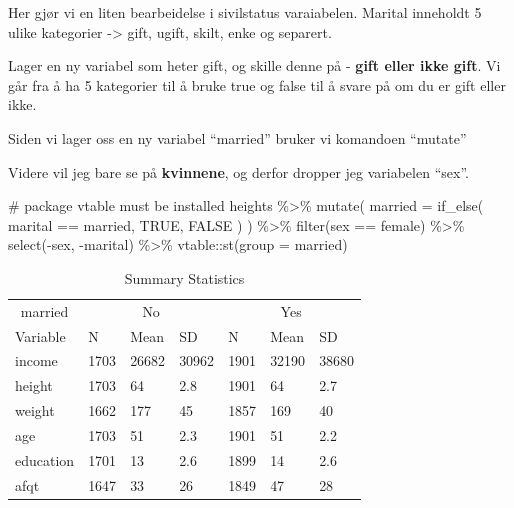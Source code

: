 \documentclass[
  letterpaper,
  DIV=11,
  numbers=noendperiod]{scrartcl}
\newenvironment{Shaded}{\begin{snugshade}}{\end{snugshade}}
\newcommand{\AttributeTok}[1]{\textcolor[rgb]{0.40,0.45,0.13}{#1}}
\newcommand{\CommentTok}[1]{\textcolor[rgb]{0.37,0.37,0.37}{#1}}
\newcommand{\ConstantTok}[1]{\textcolor[rgb]{0.56,0.35,0.01}{#1}}
\newcommand{\FunctionTok}[1]{\textcolor[rgb]{0.28,0.35,0.67}{#1}}
\newcommand{\NormalTok}[1]{\textcolor[rgb]{0.00,0.23,0.31}{#1}}
\newcommand{\SpecialCharTok}[1]{\textcolor[rgb]{0.37,0.37,0.37}{#1}}
\newcommand{\StringTok}[1]{\textcolor[rgb]{0.13,0.47,0.30}{#1}}
\begin{document}
Her gjør vi en liten bearbeidelse i sivilstatus varaiabelen. Marital
inneholdt 5 ulike kategorier -\textgreater{} gift, ugift, skilt, enke og
separert.

Lager en ny variabel som heter gift, og skille denne på - \textbf{gift
eller ikke gift}. Vi går fra å ha 5 kategorier til å bruke true og false
til å svare på om du er gift eller ikke.

Siden vi lager oss en ny variabel ``married'' bruker vi komandoen
``mutate''

Videre vil jeg bare se på \textbf{kvinnene}, og derfor dropper jeg
variabelen ``sex''.

\begin{Shaded}
\begin{Highlighting}[]
\CommentTok{\# package vtable must be installed}
\NormalTok{heights }\SpecialCharTok{\%\textgreater{}\%} 
  \FunctionTok{mutate}\NormalTok{(}
    \AttributeTok{married =} \FunctionTok{if\_else}\NormalTok{(}
\NormalTok{    marital }\SpecialCharTok{==} \StringTok{\textquotesingle{}married\textquotesingle{}}\NormalTok{, }
    \ConstantTok{TRUE}\NormalTok{,}
    \ConstantTok{FALSE}
\NormalTok{    )}
\NormalTok{  ) }\SpecialCharTok{\%\textgreater{}\%} 
  \FunctionTok{filter}\NormalTok{(sex }\SpecialCharTok{==} \StringTok{\textquotesingle{}female\textquotesingle{}}\NormalTok{) }\SpecialCharTok{\%\textgreater{}\%} 
  \FunctionTok{select}\NormalTok{(}\SpecialCharTok{{-}}\NormalTok{sex, }\SpecialCharTok{{-}}\NormalTok{marital) }\SpecialCharTok{\%\textgreater{}\%} 
\NormalTok{  vtable}\SpecialCharTok{::}\FunctionTok{st}\NormalTok{(}\AttributeTok{group =} \StringTok{\textquotesingle{}married\textquotesingle{}}\NormalTok{)}
\end{Highlighting}
\end{Shaded}

\begin{table}

\caption{Summary Statistics}
\centering
\begin{tabular}[t]{lllllll}
\toprule
\multicolumn{1}{c}{married} & \multicolumn{3}{c}{No} & \multicolumn{3}{c}{Yes} \\
\cmidrule(l{3pt}r{3pt}){1-1} \cmidrule(l{3pt}r{3pt}){2-4} \cmidrule(l{3pt}r{3pt}){5-7}
Variable & N & Mean & SD & N & Mean & SD\\
\midrule
income & 1703 & 26682 & 30962 & 1901 & 32190 & 38680\\
height & 1703 & 64 & 2.8 & 1901 & 64 & 2.7\\
weight & 1662 & 177 & 45 & 1857 & 169 & 40\\
age & 1703 & 51 & 2.3 & 1901 & 51 & 2.2\\
education & 1701 & 13 & 2.6 & 1899 & 14 & 2.6\\
\addlinespace
afqt & 1647 & 33 & 26 & 1849 & 47 & 28\\
\bottomrule
\end{tabular}
\end{table}
\end{document}
